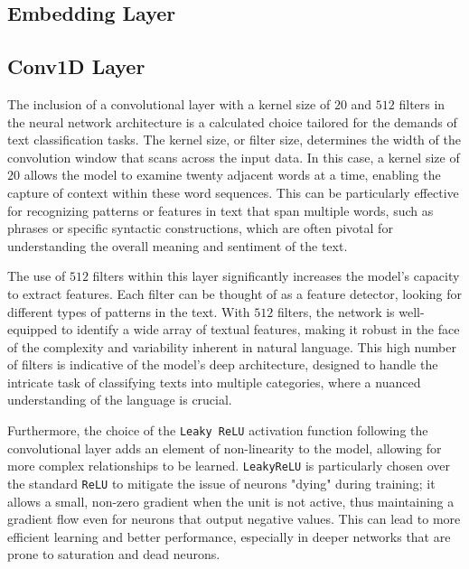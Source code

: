 \subsection{Embedding Layer}

\subsection{Conv1D Layer}
The inclusion of a convolutional layer with a kernel size of $20$ and $512$ filters in the neural network architecture is a calculated choice tailored for the demands of text classification tasks. The kernel size, or filter size, determines the width of the convolution window that scans across the input data. In this case, a kernel size of $20$ allows the model to examine twenty adjacent words at a time, enabling the capture of context within these word sequences. This can be particularly effective for recognizing patterns or features in text that span multiple words, such as phrases or specific syntactic constructions, which are often pivotal for understanding the overall meaning and sentiment of the text.

The use of $512$ filters within this layer significantly increases the model's capacity to extract features. Each filter can be thought of as a feature detector, looking for different types of patterns in the text. With $512$ filters, the network is well-equipped to identify a wide array of textual features, making it robust in the face of the complexity and variability inherent in natural language. This high number of filters is indicative of the model's deep architecture, designed to handle the intricate task of classifying texts into multiple categories, where a nuanced understanding of the language is crucial.

Furthermore, the choice of the \verb|Leaky ReLU| activation function following the convolutional layer adds an element of non-linearity to the model, allowing for more complex relationships to be learned. \verb|LeakyReLU| is particularly chosen over the standard \verb|ReLU| to mitigate the issue of neurons "dying" during training; it allows a small, non-zero gradient when the unit is not active, thus maintaining a gradient flow even for neurons that output negative values. This can lead to more efficient learning and better performance, especially in deeper networks that are prone to saturation and dead neurons.

